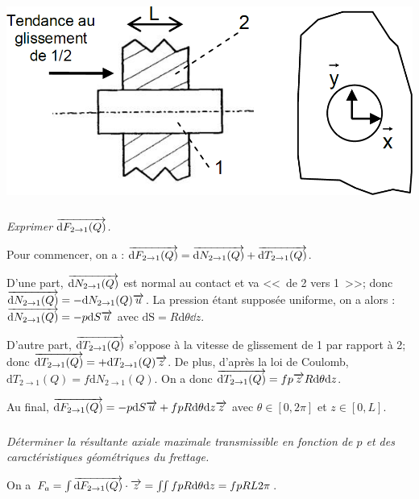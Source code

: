 \documentclass[10pt,fleqn]{article} %
\begin{document}
\begin{multicols}{2}
\begin{multicols}{2}
\begin{corrige}
\end{corrige}
\else
\fi


\begin{center}
\includegraphics[width=.9\linewidth]{images/fig_03}
\end{center}

\subparagraph{}
\textit{Exprimer $\overrightarrow{\text{d}F_{2\rightarrow 1}(Q)}$.}

\ifprof
\begin{corrige}
Pour commencer, on a : $\overrightarrow{\text{d}F_{2\rightarrow 1}(Q)} = \overrightarrow{\text{d}N_{2\rightarrow 1}(Q)}+\overrightarrow{\text{d}T_{2\rightarrow 1}(Q)}$. 

D'une part, $\overrightarrow{\text{d}N_{2\rightarrow 1}(Q)}$ est normal au contact et va <<~de 2 vers 1~>>; donc $\overrightarrow{\text{d}N_{2\rightarrow 1}(Q)}=-\text{d}N_{2\rightarrow 1}(Q)\overrightarrow{u}$. La pression étant supposée uniforme, on a alors : $\overrightarrow{\text{d}N_{2\rightarrow 1}(Q)}=-p\text{d}S\overrightarrow{u}$ avec $\text{dS} = R\text{d}\theta \dd z$. 

D'autre part, $\overrightarrow{\text{d}T_{2\rightarrow 1}(Q)}$ s'oppose à la vitesse de glissement de 1 par rapport à 2; donc $\overrightarrow{\text{d}T_{2\rightarrow 1}(Q)}=+\text{d}T_{2\rightarrow 1}(Q)\overrightarrow{z}$. De plus, d'après la loi de Coulomb, $\text{d}T_{2\rightarrow 1}(Q)=f\text{d}N_{2\rightarrow 1}(Q)$. On a donc $\overrightarrow{\text{d}T_{2\rightarrow 1}(Q)}=fp\overrightarrow{z} R\text{d}\theta \text{d} z$. 

Au final, $\overrightarrow{\text{d}F_{2\rightarrow 1}(Q)}=-p\text{d}S\overrightarrow{u}+fp R\text{d}\theta \text{d} z \overrightarrow{z}$ avec $\theta\in[0,2\pi]$ et $z\in[0,L]$.
\end{corrige}
\else
\fi

\subparagraph{}
\textit{Déterminer la résultante axiale maximale transmissible en fonction de $p$ et des 
caractéristiques géométriques du frettage. }


\ifprof
\begin{corrige}
On a $F_a = \int  \overrightarrow{\text{d}F_{2\rightarrow 1}(Q)} \cdot \overrightarrow{z} = \iint fp R\text{d}\theta \text{d} z=  fp RL2\pi $.
\end{corrige}
\else
\fi



\end{multicols}
\end{multicols}
\end{document}
